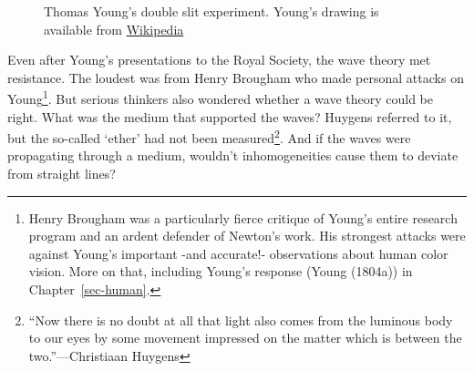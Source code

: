 \documentclass[
  letterpaper,
]{book}
\begin{document}
\begin{figure}


\caption{\label{fig-double-slit}Thomas Young's double slit experiment.
Young's drawing is available from
\href{https://en.wikipedia.org/wiki/Diffraction\#/media/File:Young_Diffraction.png}{Wikipedia}}

\end{figure}%

Even after Young's presentations to the Royal Society, the wave theory
met resistance. The loudest was from Henry Brougham who made personal
attacks on Young\footnote{Henry Brougham was a particularly fierce
  critique of Young's entire research program and an ardent defender of
  Newton's work. His strongest attacks were against Young's important
  -and accurate!- observations about human color vision. More on that,
  including Young's response (Young (1804a)) in Chapter~\ref{sec-human}.}.
But serious thinkers also wondered whether a wave theory could be right.
What was the medium that supported the waves? Huygens referred to it,
but the so-called `ether' had not been measured\footnote{``Now there is
  no doubt at all that light also comes from the luminous body to our
  eyes by some movement impressed on the matter which is between the
  two.''---Christiaan Huygens}. And if the waves were propagating
through a medium, wouldn't inhomogeneities cause them to deviate from
straight lines?
\end{document}
